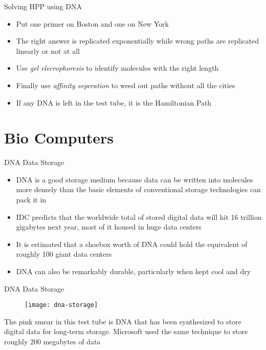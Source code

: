 \documentclass[10pt]{beamer}
\begin{document}
\begin{frame}[fragile]{Solving HPP using DNA}
  \begin{itemize}
        \item Put one primer on Boston and one on New York
    \item The right answer is replicated exponentially while wrong paths are replicated linearly or not at all
         \item Use \textit{gel elecrophoresis} to identify molecules with the right length
         \item Finally use \textit{affinity seperation} to weed out paths without all the cities
         \item If any DNA is left in the test tube, it is the Hamiltonian Path 
  \end{itemize}
\end{frame}

\section{Bio Computers}
\begin{frame}[fragile]{DNA Data Storage}
\begin{itemize}
  \item DNA is a good storage medium because data can be written into molecules more densely than the basic elements of conventional storage technologies can pack it in
    \item IDC predicts that the worldwide total of stored digital data will hit 16 trillion gigabytes next year, most of it housed in huge data centers
    \item It is estimated that a shoebox worth of DNA could hold the equivalent of roughly 100 giant data centers
    \item DNA can also be remarkably durable, particularly when kept cool and dry
\end{itemize}
\end{frame}

 \begin{frame}[fragile]{DNA Data Storage}
  \begin{figure}
        \texttt{[image: dna-storage]} 
  \end{figure}
    The pink smear in this test tube is DNA that has been synthesized to store digital data for long-term storage. Microsoft used the same technique to store roughly 200 megabytes of data
\end{frame}
\end{document}

